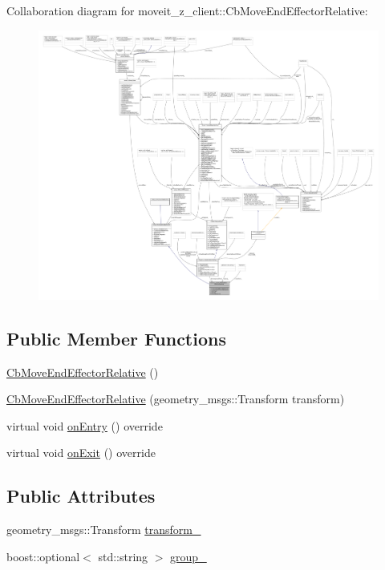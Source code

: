 Collaboration diagram for moveit\+\_\+z\+\_\+client\+:\+:Cb\+Move\+End\+Effector\+Relative\+:
\nopagebreak
\begin{figure}[H]
\begin{center}
\leavevmode
\includegraphics[width=350pt]{classmoveit__z__client_1_1CbMoveEndEffectorRelative__coll__graph}
\end{center}
\end{figure}
\subsection*{Public Member Functions}
\begin{DoxyCompactItemize}
\item 
\hyperlink{classmoveit__z__client_1_1CbMoveEndEffectorRelative_aeabc32977cfd2e7bc34eef1cfd27d8a6}{Cb\+Move\+End\+Effector\+Relative} ()
\item 
\hyperlink{classmoveit__z__client_1_1CbMoveEndEffectorRelative_ae0add509837039979cbb3b722257fe7e}{Cb\+Move\+End\+Effector\+Relative} (geometry\+\_\+msgs\+::\+Transform transform)
\item 
virtual void \hyperlink{classmoveit__z__client_1_1CbMoveEndEffectorRelative_ae425a51d23933a13a87df9cd26f0fc99}{on\+Entry} () override
\item 
virtual void \hyperlink{classmoveit__z__client_1_1CbMoveEndEffectorRelative_af23c69f0919a2f62fbddf0e1dbdb83e1}{on\+Exit} () override
\end{DoxyCompactItemize}
\subsection*{Public Attributes}
\begin{DoxyCompactItemize}
\item 
geometry\+\_\+msgs\+::\+Transform \hyperlink{classmoveit__z__client_1_1CbMoveEndEffectorRelative_a0686340d0328df4d0ecb962b61026f43}{transform\+\_\+}
\item 
boost\+::optional$<$ std\+::string $>$ \hyperlink{classmoveit__z__client_1_1CbMoveEndEffectorRelative_a143fdce14603f8c78aae258b605ff607}{group\+\_\+}
\end{DoxyCompactItemize}
